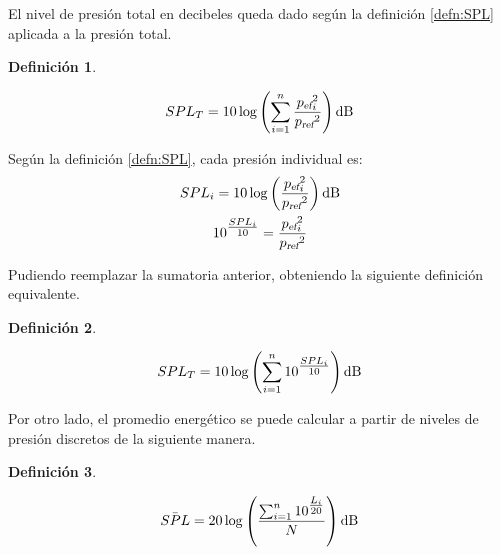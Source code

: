\documentclass[a5paper,12pt,twoside]{book}
\newtheorem{defn}{{Definición}}[chapter]
\begin{document}
El nivel de presión total en decibeles queda dado según la definición \ref{defn:SPL} aplicada a la presión total.


\begin{mdframed}[style=DefinitionFrame]
    \begin{defn}
    \end{defn}
    \begin{equation*}
        SPL_T = 10 \log \left( \sum_{\ith=1}^\nth \frac{\rms{p}_\ith^2}{\sub{p}{ref}^2} \right) \si{\deci\bel}
    \end{equation*}
\end{mdframed}

Según la definición \ref{defn:SPL}, cada presión individual es:
\begin{gather*}
    SPL_\ith = 10 \log \left( \frac{\rms{p}_\ith^2}{\sub{p}{ref}^2} \right) \si{\deci\bel}
    \\
    10^{\tfrac{SPL_\ith}{10}} = \frac{\rms{p}_\ith^2}{\sub{p}{ref}^2}
\end{gather*}

Pudiendo reemplazar la sumatoria anterior, obteniendo la siguiente definición equivalente.

\begin{mdframed}[style=DefinitionFrame]
    \begin{defn}
    \end{defn}
    \begin{equation*}
        SPL_T = 10 \log \left( \sum_{\ith=1}^\nth 10^{\tfrac{SPL_\ith}{10}} \right) \si{\deci\bel}
    \end{equation*}
\end{mdframed}

Por otro lado, el promedio energético se puede calcular a partir de niveles de presión discretos de la siguiente manera.

\begin{mdframed}[style=DefinitionFrame]
    \begin{defn}
    \end{defn}
    \begin{equation*}
        \ave{SPL}=20\log\left(\frac{\sum_{\ith=1}^\nth 10^{\tfrac{L_\ith}{20}}}{N}\right) \si{\deci\bel}
    \end{equation*}
\end{mdframed}
\end{document}
